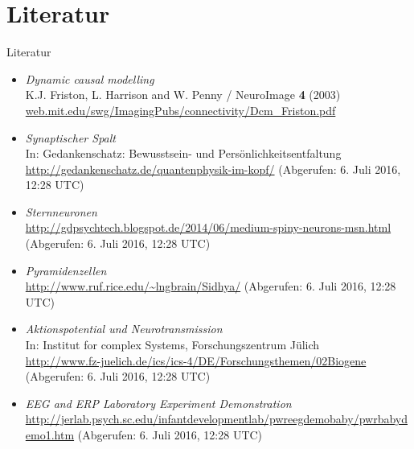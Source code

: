 \documentclass{beamer}
\begin{document}
\section{Literatur}
	\begin{frame}{Literatur}
		\begin{itemize}
			\item \textit{Dynamic causal modelling} \\ {\small K.J. Friston, L. Harrison and W. Penny / NeuroImage \textbf{4} (2003)} \\ {\footnotesize \url{web.mit.edu/swg/ImagingPubs/connectivity/Dcm_Friston.pdf}}
			\item \textit{Synaptischer Spalt}\\  {\small In: Gedankenschatz: Bewusstsein- und Persönlichkeitsentfaltung}\\{\footnotesize \url{http://gedankenschatz.de/quantenphysik-im-kopf/}}  {\tiny(Abgerufen: 6. Juli 2016, 12:28 UTC)}
						\item \textit{Sternneuronen}\\{\footnotesize \url{http://gdpsychtech.blogspot.de/2014/06/medium-spiny-neurons-msn.html}}  {\tiny(Abgerufen: 6. Juli 2016, 12:28 UTC)}	
						\item \textit{Pyramidenzellen}\\{\footnotesize \url{http://www.ruf.rice.edu/~lngbrain/Sidhya/}}  {\tiny(Abgerufen: 6. Juli 2016, 12:28 UTC)}	
						\item \textit{Aktionspotential und Neurotransmission}\\{\small In: Institut for complex Systems, Forschungszentrum Jülich}\\{\footnotesize \url{http://www.fz-juelich.de/ics/ics-4/DE/Forschungsthemen/02Biogene}}  {\tiny(Abgerufen: 6. Juli 2016, 12:28 UTC)}
												\item \textit{EEG and ERP Laboratory Experiment Demonstration}\\{\footnotesize \url{http://jerlab.psych.sc.edu/infantdevelopmentlab/pwreegdemobaby/pwrbabydemo1.htm}}  {\tiny(Abgerufen: 6. Juli 2016, 12:28 UTC)}
		\end{itemize}
	\end{frame}
\end{document}
